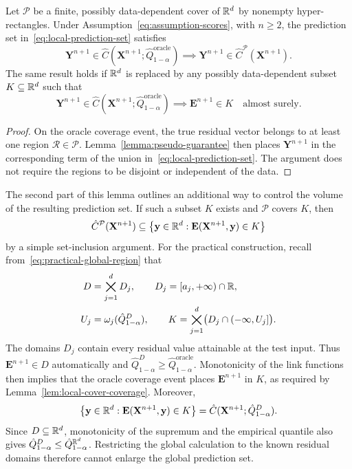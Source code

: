 {\begin{lemma}\label{lem:local-cover-coverage}
Let $\mathcal P$ be a finite, possibly data-dependent cover of $\mathbb{R}^d$ by nonempty hyper-rectangles. Under Assumption~\ref{eq:assumption-scores}, with $n\geq2$, the prediction set in~\eqref{eq:local-prediction-set} satisfies
\[
\mathbf Y^{n+1}\in\hat C(\mathbf X^{n+1};\hat Q^{\mathrm{oracle}}_{1-\alpha})
\implies
\mathbf Y^{n+1}\in\hat C^{\mathcal P}(\mathbf X^{n+1}).
\]
The same result holds if $\mathbb{R}^d$ is replaced by any possibly data-dependent subset $K\subseteq\mathbb{R}^d$ such that
\[
\mathbf Y^{n+1}\in\hat C(\mathbf X^{n+1};\hat Q^{\mathrm{oracle}}_{1-\alpha})
\implies
\mathbf E^{n+1}\in K
\quad\text{almost surely}.
\]
\end{lemma}

\begin{proof}
On the oracle coverage event, the true residual vector belongs to at least one region $\mathcal R\in\mathcal P$. Lemma~\ref{lemma:pseudo-guarantee} then places $\mathbf Y^{n+1}$ in the corresponding term of the union in~\eqref{eq:local-prediction-set}. The argument does not require the regions to be disjoint or independent of the data.
\end{proof}

The second part of this lemma outlines an additional way to control the volume of the resulting prediction set. If such a subset $K$ exists and $\mathcal P$ covers $K$, then
\[
\hat C^{\mathcal P}(\mathbf X^{n+1})
\subseteq
\left\{\mathbf y\in\mathbb{R}^d:
\mathbf E(\mathbf X^{n+1},\mathbf y)\in K\right\}
\]
by a simple set-inclusion argument. For the practical construction, recall from~\eqref{eq:practical-global-region} that
\[
\begin{aligned}
D&=\bigtimes_{j=1}^d D_j,
\qquad D_j=[a_j,+\infty)\cap\mathbb{R},\\
U_j&=\omega_j(\hat Q^D_{1-\alpha}),
\qquad K=\bigtimes_{j=1}^d\bigl(D_j\cap(-\infty,U_j]\bigr).
\end{aligned}
\]
The domains $D_j$ contain every residual value attainable at the test input. Thus $\mathbf E^{n+1}\in D$ automatically and $\hat Q^D_{1-\alpha}\geq\hat Q^{\mathrm{oracle}}_{1-\alpha}$. Monotonicity of the link functions then implies that the oracle coverage event places $\mathbf E^{n+1}$ in $K$, as required by Lemma~\ref{lem:local-cover-coverage}. Moreover,
\[
\left\{\mathbf y\in\mathbb{R}^d:
\mathbf E(\mathbf X^{n+1},\mathbf y)\in K\right\}
=\hat C(\mathbf X^{n+1};\hat Q^D_{1-\alpha}).
\]
Since $D\subseteq\mathbb{R}^d$, monotonicity of the supremum and the empirical quantile also gives $\hat Q^D_{1-\alpha}\leq\hat Q^{\mathbb{R}^d}_{1-\alpha}$. Restricting the global calculation to the known residual domains therefore cannot enlarge the global prediction set.

}
